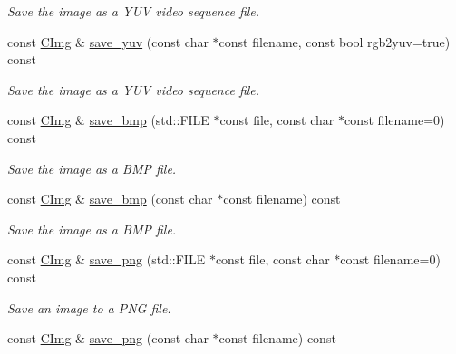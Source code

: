 \begin{DoxyCompactItemize}
\begin{DoxyCompactList}\small\item\em Save the image as a Y\-U\-V video sequence file. \end{DoxyCompactList}\item 
\hypertarget{structcimg__library_1_1_c_img_aa14c3969f237c6f899b06a3818dc187a}{const \hyperlink{structcimg__library_1_1_c_img}{C\-Img} \& \hyperlink{structcimg__library_1_1_c_img_aa14c3969f237c6f899b06a3818dc187a}{save\-\_\-yuv} (const char $\ast$const filename, const bool rgb2yuv=true) const }\label{structcimg__library_1_1_c_img_aa14c3969f237c6f899b06a3818dc187a}

\begin{DoxyCompactList}\small\item\em Save the image as a Y\-U\-V video sequence file. \end{DoxyCompactList}\item 
\hypertarget{structcimg__library_1_1_c_img_a505479a53dd6ee630d0c8c8a2bd24357}{const \hyperlink{structcimg__library_1_1_c_img}{C\-Img} \& \hyperlink{structcimg__library_1_1_c_img_a505479a53dd6ee630d0c8c8a2bd24357}{save\-\_\-bmp} (std\-::\-F\-I\-L\-E $\ast$const file, const char $\ast$const filename=0) const }\label{structcimg__library_1_1_c_img_a505479a53dd6ee630d0c8c8a2bd24357}

\begin{DoxyCompactList}\small\item\em Save the image as a B\-M\-P file. \end{DoxyCompactList}\item 
\hypertarget{structcimg__library_1_1_c_img_ad995c489d16a78cbdf6f7f5e9e042c67}{const \hyperlink{structcimg__library_1_1_c_img}{C\-Img} \& \hyperlink{structcimg__library_1_1_c_img_ad995c489d16a78cbdf6f7f5e9e042c67}{save\-\_\-bmp} (const char $\ast$const filename) const }\label{structcimg__library_1_1_c_img_ad995c489d16a78cbdf6f7f5e9e042c67}

\begin{DoxyCompactList}\small\item\em Save the image as a B\-M\-P file. \end{DoxyCompactList}\item 
const \hyperlink{structcimg__library_1_1_c_img}{C\-Img} \& \hyperlink{structcimg__library_1_1_c_img_ad9fa47a9f824507ce8feb7d9f6e76b06}{save\-\_\-png} (std\-::\-F\-I\-L\-E $\ast$const file, const char $\ast$const filename=0) const 
\begin{DoxyCompactList}\small\item\em Save an image to a P\-N\-G file. \end{DoxyCompactList}\item 
\hypertarget{structcimg__library_1_1_c_img_a8619972ee3d37f3f389a9c2df1b29005}{const \hyperlink{structcimg__library_1_1_c_img}{C\-Img} \& \hyperlink{structcimg__library_1_1_c_img_a8619972ee3d37f3f389a9c2df1b29005}{save\-\_\-png} (const char $\ast$const filename) const }\label{structcimg__library_1_1_c_img_a8619972ee3d37f3f389a9c2df1b29005}


\end{DoxyCompactItemize}
